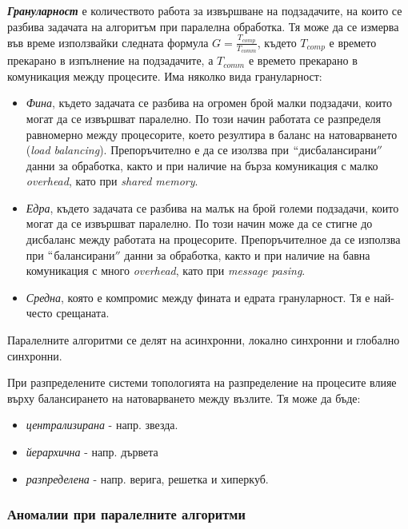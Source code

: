 \documentclass[fleqn,12pt]{article}
\begin{document}
\textbf{\textit{Грануларност}} е количеството работа за извършване на подзадачите, на които се разбива задачата на алгоритъм при паралелна обработка.
Тя може да се измерва във време използвайки следната формула $G = \frac{T_{comp}}{T_{comm}}$, където $T_{comp}$ е времето прекарано в изпълнение на подзадачите, а $T_{comm}$ е времето прекарано в комуникация между процесите.
Има няколко вида грануларност:
\begin{itemize}
    \item \textit{Фина}, където задачата се разбива на огромен брой малки подзадачи, които могат да се извършват паралелно.
    По този начин работата се разпределя равномерно между процесорите, което резултира в баланс на натоварването (\textit{load balancing}).
    Препоръчително е да се изолзва при $``$дисбалансирани$''$ данни за обработка, както и при наличие на бърза комуникация с малко \textit{overhead}, като при \textit{shared memory}.
    \item \textit{Едра}, където задачата се разбива на малък на брой големи подзадачи, които могат да се извършват паралелно.
    По този начин може да се стигне до дисбаланс между работата на процесорите.
    Препоръчителное да се използва при $``$балансирани$''$ данни за обработка, както и при наличие на бавна комуникация с много \textit{overhead}, като при \textit{message pasing}.
    \item \textit{Средна}, която е компромис между фината и едрата грануларност.
    Тя е най-често срещаната.
\end{itemize}
\bigbreak

Паралелните алгоритми се делят на асинхронни, локално синхронни и глобално синхронни.
\bigbreak

При разпределените системи топологията на разпределение на процесите влияе върху балансирането на натоварването между възлите. Тя може да бъде:
\begin{itemize}
    \item \textit{централизирана} - напр. звезда.
    \item \textit{йерархична} - напр. дървета
    \item \textit{разпределена} - напр. верига, решетка и хиперкуб.
\end{itemize}

\subsubsection{Аномалии при паралелните алгоритми}
\end{document}
